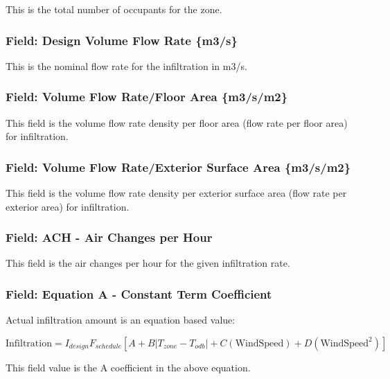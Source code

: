 This is the total number of occupants for the zone.

\subsubsection{Field: Design Volume Flow Rate \{m3/s\}}\label{field-design-volume-flow-rate-m3s}

This is the nominal flow rate for the infiltration in m3/s.

\subsubsection{Field: Volume Flow Rate/Floor Area \{m3/s/m2\}}\label{field-volume-flow-ratefloor-area-m3sm2}

This field is the volume flow rate density per floor area (flow rate per floor area) for infiltration.

\subsubsection{Field: Volume Flow Rate/Exterior Surface Area \{m3/s/m2\}}\label{field-volume-flow-rateexterior-surface-area-m3sm2}

This field is the volume flow rate density per exterior surface area (flow rate per exterior area) for infiltration.

\subsubsection{Field: ACH - Air Changes per Hour}\label{field-ach---air-changes-per-hour}

This field is the air changes per hour for the given infiltration rate.

\subsubsection{Field: Equation A - Constant Term Coefficient}\label{field-equation-a---constant-term-coefficient}

Actual infiltration amount is an equation based value:

\begin{equation}
\text{Infiltration} = I_{design} F_{schedule} \left[ A + B \left| T_{zone}-T_{odb} \right| + C\left(\text{WindSpeed}\right) + D\left(\text{WindSpeed}^2\right)  \right]
\end{equation}

This field value is the A coefficient in the above equation.

